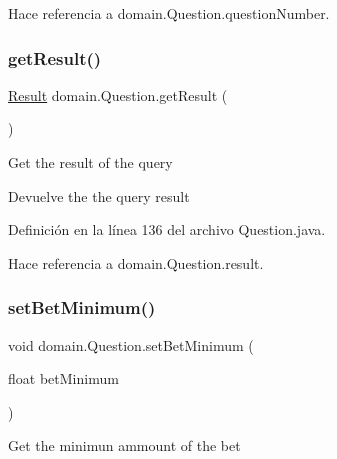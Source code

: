 Hace referencia a domain.\+Question.\+question\+Number.

\mbox{\label{classdomain_1_1Question_a608b5afe5363593b9e1c2e2db929346d}} 
\subsubsection{\texorpdfstring{getResult()}{getResult()}}
{\footnotesize\ttfamily \mbox{\hyperlink{classdomain_1_1Result}{Result}} domain.\+Question.\+get\+Result (\begin{DoxyParamCaption}{ }\end{DoxyParamCaption})}

Get the result of the query

\begin{DoxyReturn}{Devuelve}
the the query result 
\end{DoxyReturn}


Definición en la línea 136 del archivo Question.\+java.


\begin{DoxyCode}{0}

\end{DoxyCode}


Hace referencia a domain.\+Question.\+result.

\mbox{\label{classdomain_1_1Question_a66ef61fd241c1ee6dbb8ea9ce14ae9ce}} 
\subsubsection{\texorpdfstring{setBetMinimum()}{setBetMinimum()}}
{\footnotesize\ttfamily void domain.\+Question.\+set\+Bet\+Minimum (\begin{DoxyParamCaption}\item[{float}]{bet\+Minimum }\end{DoxyParamCaption})}

Get the minimun ammount of the bet


